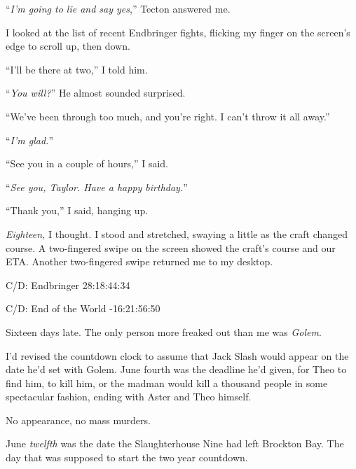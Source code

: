 ``\emph{I'm going to lie and say yes},'' Tecton answered me.



I looked at the list of recent Endbringer fights, flicking my finger on the screen's edge to scroll up, then down.



``I'll be there at two,'' I told him.



``\emph{You will?}''  He almost sounded surprised.



``We've been through too much, and you're right.  I can't throw it all away.''



``\emph{I'm glad.}''



``See you in a couple of hours,'' I said.



``\emph{See you, Taylor.  Have a happy birthday.}''



``Thank you,'' I said, hanging up.



\emph{Eighteen, }I thought.  I stood and stretched, swaying a little as the craft changed course.  A two-fingered swipe on the screen showed the craft's course and our ETA.  Another two-fingered swipe returned me to my desktop.



C/D: Endbringer
28:18:44:34



C/D: End of the World
-16:21:56:50



Sixteen days late.  The only person more freaked out than me was \emph{Golem}.



I'd revised the countdown clock to assume that Jack Slash would appear on the date he'd set with Golem.  June fourth was the deadline he'd given, for Theo to find him, to kill him, or the madman would kill a thousand people in some spectacular fashion, ending with Aster and Theo himself.



No appearance, no mass murders.



June \emph{twelfth} was the date the Slaughterhouse Nine had left Brockton Bay.  The day that was supposed to start the two year countdown.



